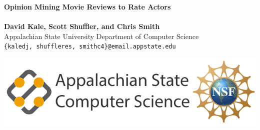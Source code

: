 \documentclass[a0,portrait]{a0poster}
\begin{document}


\begin{minipage}[b]{0.75\linewidth}
\veryHuge \color{NavyBlue} \textbf{Opinion Mining Movie Reviews to Rate Actors} \color{Black}\\ %
\Huge\textit{}\\[2cm] %
\huge \textbf{David Kale, Scott Shuffler, and Chris Smith}\\[0.5cm] %
\huge Appalachian State University Department of Computer Science\\[0.6cm] %
\Large \texttt{\{kaledj, shuffleres, smithc4\}@email.appstate.edu}\\
\end{minipage}
%
\begin{minipage}[b]{0.25\linewidth}
\includegraphics[width=20cm]{cs6}\\
\end{minipage}

\vspace{1cm} %

\end{document}
